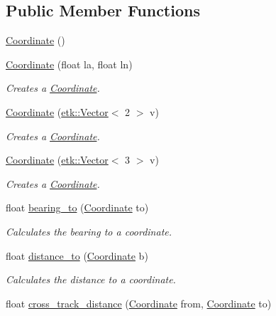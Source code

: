\subsection*{Public Member Functions}
\begin{DoxyCompactItemize}
\item 
\hyperlink{classetk_1_1_coordinate_a6f5e7ae3e170f4ced2e6917c4e59c9c9}{Coordinate} ()
\item 
\hyperlink{classetk_1_1_coordinate_a9e121c4f43995212e0c857bf3cf30c2a}{Coordinate} (float la, float ln)
\begin{DoxyCompactList}\small\item\em Creates a \hyperlink{classetk_1_1_coordinate}{Coordinate}. \end{DoxyCompactList}\item 
\hyperlink{classetk_1_1_coordinate_a61fb53571c35d863975d8b30d79a829e}{Coordinate} (\hyperlink{classetk_1_1_vector}{etk\-::\-Vector}$<$ 2 $>$ v)
\begin{DoxyCompactList}\small\item\em Creates a \hyperlink{classetk_1_1_coordinate}{Coordinate}. \end{DoxyCompactList}\item 
\hyperlink{classetk_1_1_coordinate_a5576579a2a9047c3fc7caa8063b5f94a}{Coordinate} (\hyperlink{classetk_1_1_vector}{etk\-::\-Vector}$<$ 3 $>$ v)
\begin{DoxyCompactList}\small\item\em Creates a \hyperlink{classetk_1_1_coordinate}{Coordinate}. \end{DoxyCompactList}\item 
float \hyperlink{classetk_1_1_coordinate_ad8e63194003e876f7e52e85d09a15cbb}{bearing\-\_\-to} (\hyperlink{classetk_1_1_coordinate}{Coordinate} to)
\begin{DoxyCompactList}\small\item\em Calculates the bearing to a coordinate. \end{DoxyCompactList}\item 
float \hyperlink{classetk_1_1_coordinate_afdc37e37396d5efd0ed16f76ee3df46d}{distance\-\_\-to} (\hyperlink{classetk_1_1_coordinate}{Coordinate} b)
\begin{DoxyCompactList}\small\item\em Calculates the distance to a coordinate. \end{DoxyCompactList}\item 
float \hyperlink{classetk_1_1_coordinate_a342706a6ba36f2d4349fd1b2eb32bd41}{cross\-\_\-track\-\_\-distance} (\hyperlink{classetk_1_1_coordinate}{Coordinate} from, \hyperlink{classetk_1_1_coordinate}{Coordinate} to)

\end{DoxyCompactItemize}

